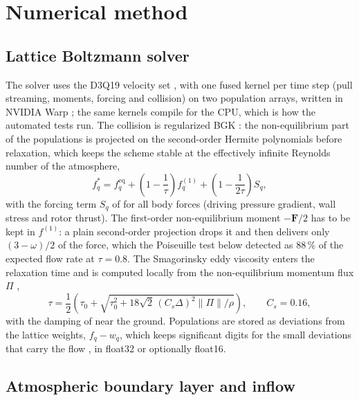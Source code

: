 \documentclass[11pt,a4paper]{article}
\begin{document}
\section{Numerical method}
\label{sec:method}

\subsection{Lattice Boltzmann solver}

The solver uses the D3Q19 velocity set \citep{kruger2017lbm}, with one fused kernel per time step (pull
streaming, moments, forcing and collision) on two population arrays, written in NVIDIA Warp \citep{macklin2022warp};
the same kernels compile for the CPU, which is how the automated tests run. The collision is regularized BGK
\citep{latt2006regularized}: the non-equilibrium part of the populations is projected on the second-order Hermite
polynomials before relaxation, which keeps the scheme stable at the effectively infinite Reynolds number of the
atmosphere,
\begin{equation}
  f_q^{*} = f_q^{\mathrm{eq}} + \left(1 - \frac{1}{\tau}\right) f_q^{(1)} + \left(1 - \frac{1}{2\tau}\right) S_q ,
\end{equation}
with the forcing term $S_q$ of \citet{guo2002forcing} for all body forces (driving pressure gradient, wall stress
and rotor thrust). The first-order non-equilibrium moment $-\mathbf{F}/2$ has to be kept in $f^{(1)}$: a plain
second-order projection drops it and then delivers only $(3-\omega)/2$ of the force, which the Poiseuille test
below detected as 88\,\% of the expected flow rate at $\tau = 0.8$. The Smagorinsky eddy viscosity
\citep{smagorinsky1963} enters the relaxation time and is computed locally from the non-equilibrium momentum flux
$\Pi$ \citep{hou1994subgrid},
\begin{equation}
  \tau = \frac{1}{2}\left(\tau_0 + \sqrt{\tau_0^2 + 18\sqrt{2}\,(C_s \Delta)^2 \lVert \Pi \rVert / \rho}\right),
  \qquad C_s = 0.16 ,
\end{equation}
with the damping of \citet{mason1992backscatter} near the ground. Populations are stored as deviations from the
lattice weights, $f_q - w_q$, which keeps significant digits for the small deviations that carry the flow
\citep{lehmann2022precision}, in float32 or optionally float16.

\subsection{Atmospheric boundary layer and inflow}
\end{document}
